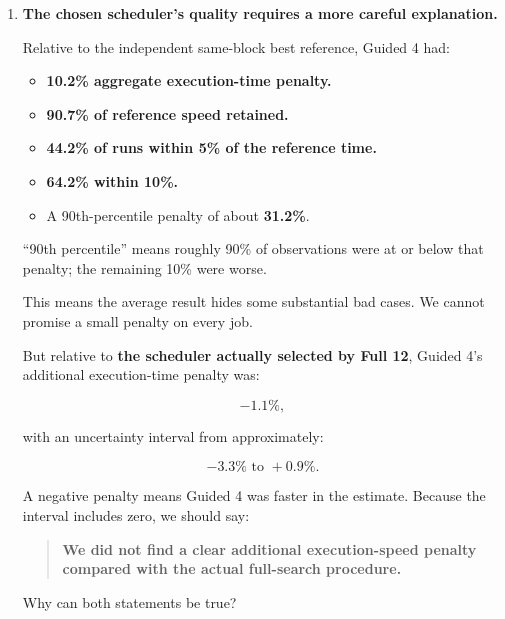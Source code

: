 \documentclass[11pt,a4paper]{article}
\providecommand{\tightlist}{\setlength{\itemsep}{0pt}\setlength{\parskip}{3pt}}
\begin{document}
\begin{enumerate}
  At 50 useful executions:

  \[
  1-\frac{1}{1.379}\approx27.5\%.
  \]

  Think of a comparison where full search takes 100 time units: Guided 4 would take about 72.5.

  \textbf{Why does the percentage saving shrink for longer jobs?} Choosing is a one-time expense. As useful execution grows, it becomes a smaller part of the whole bill.
\item
  \textbf{The chosen scheduler's quality requires a more careful explanation.}

  Relative to the independent same-block best reference, Guided 4 had:

  \begin{itemize}
  \tightlist
  \item
    \textbf{10.2\% aggregate execution-time penalty.}
  \item
    \textbf{90.7\% of reference speed retained.}
  \item
    \textbf{44.2\% of runs within 5\% of the reference time.}
  \item
    \textbf{64.2\% within 10\%.}
  \item
    A 90th-percentile penalty of about \textbf{31.2\%}.
  \end{itemize}

  ``90th percentile'' means roughly 90\% of observations were at or below that penalty; the remaining 10\% were worse.

  This means the average result hides some substantial bad cases. We cannot promise a small penalty on every job.

  But relative to \textbf{the scheduler actually selected by Full 12}, Guided 4's additional execution-time penalty was:

  \[
  -1.1\%,
  \]

  with an uncertainty interval from approximately:

  \[
  -3.3\%\text{ to }+0.9\%.
  \]

  A negative penalty means Guided 4 was faster in the estimate. Because the interval includes zero, we should say:

  \begin{quote}
  \textbf{We did not find a clear additional execution-speed penalty compared with the actual full-search procedure.}
  \end{quote}

  Why can both statements be true?


\end{enumerate}
\end{document}
